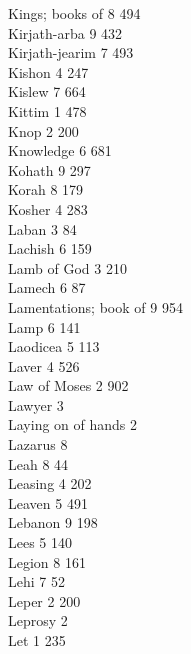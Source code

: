 Kings; books of \hfill 8 \quad \phantom{0}494\\
Kirjath-arba \hfill 9 \quad \phantom{0}432\\
Kirjath-jearim \hfill 7 \quad \phantom{0}493\\
Kishon \hfill 4 \quad \phantom{0}247\\
Kislew \hfill 7 \quad \phantom{0}664\\
Kittim \hfill 1 \quad \phantom{0}478\\
Knop \hfill 2 \quad \phantom{0}200\\
Knowledge \hfill 6 \quad \phantom{0}681\\
Kohath \hfill 9 \quad \phantom{0}297\\
Korah \hfill 8 \quad \phantom{0}179\\
Kosher \hfill 4 \quad \phantom{0}283\\
Laban \hfill 3 \quad \phantom{0}\phantom{0}84\\
Lachish \hfill 6 \quad \phantom{0}159\\
Lamb of God \hfill 3 \quad \phantom{0}210\\
Lamech \hfill 6 \quad \phantom{0}\phantom{0}87\\
Lamentations; book of \hfill 9 \quad \phantom{0}954\\
Lamp \hfill 6 \quad \phantom{0}141\\
Laodicea \hfill 5 \quad \phantom{0}113\\
Laver \hfill 4 \quad \phantom{0}526\\
Law of Moses \hfill 2 \quad \phantom{0}902\\
Lawyer \hfill 3 \\
Laying on of hands \hfill 2 \\
Lazarus \hfill 8 \\
Leah \hfill 8 \quad \phantom{0}\phantom{0}44\\
Leasing \hfill 4 \quad \phantom{0}202\\
Leaven \hfill 5 \quad \phantom{0}491\\
Lebanon \hfill 9 \quad \phantom{0}198\\
Lees \hfill 5 \quad \phantom{0}140\\
Legion \hfill 8 \quad \phantom{0}161\\
Lehi \hfill 7 \quad \phantom{0}\phantom{0}52\\
Leper \hfill 2 \quad \phantom{0}200\\
Leprosy \hfill 2 \\
Let \hfill 1 \quad \phantom{0}235\\
